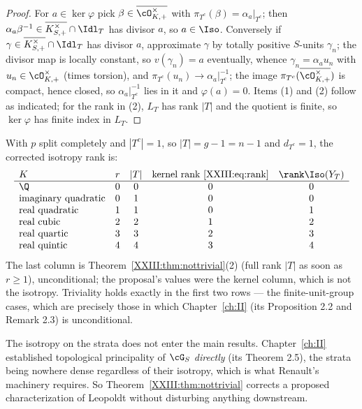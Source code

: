 \begin{proof}
For $a\in\ker\varphi$ pick $\beta\in\overline{\cO^\times_{K,+}}$ with
$\pi_{T^c}(\beta)=\alpha_a|_{T^c}$; then $\alpha_a\beta^{-1}\in
\overline{K^\times_{S,+}}\cap\Idl_T$ has divisor $a$, so $a\in\Iso$. Conversely if
$\gamma\in\overline{K^\times_{S,+}}\cap\Idl_T$ has divisor $a$, approximate $\gamma$ by
totally positive $S$-units $\gamma_n$; the divisor map is locally constant, so
$v(\gamma_n)=a$ eventually, whence $\gamma_n=\alpha_au_n$ with
$u_n\in\cO^\times_{K,+}$ (times torsion), and $\pi_{T^c}(u_n)\to\alpha_a|_{T^c}^{-1}$; the
image $\pi_{T^c}(\overline{\cO^\times_{K,+}})$ is compact, hence closed, so
$\alpha_a|_{T^c}^{-1}$ lies in it and $\varphi(a)=0$. Items (1) and (2) follow as indicated;
for the rank in (2), $L_T$ has rank $|T|$ and the quotient is finite, so
$\ker\varphi$ has finite index in $L_T$.
\end{proof}

\begin{remark}\label{XXIII:rem:table}
With $p$ split completely and $|T^c|=1$, so $|T|=g-1=n-1$ and $d_{T^c}=1$, the corrected
isotropy rank is:
\[
\begin{array}{lcccc}
K & r & |T| & \text{kernel rank \eqref{XXIII:eq:rank}} & \rank\Iso(Y_T)\\\hline
\Q & 0 & 0 & 0 & 0\\
\text{imaginary quadratic} & 0 & 1 & 0 & 0\\
\text{real quadratic} & 1 & 1 & 0 & 1\\
\text{real cubic} & 2 & 2 & 1 & 2\\
\text{real quartic} & 3 & 3 & 2 & 3\\
\text{real quintic} & 4 & 4 & 3 & 4
\end{array}
\]
The last column is Theorem~\ref{XXIII:thm:nottrivial}(2) (full rank $|T|$ as soon as $r\ge1$),
unconditional; the proposal's values were the kernel column, which is not the isotropy.
Triviality holds exactly in the first two rows --- the finite-unit-group cases, which are
precisely those in which Chapter~\ref{ch:II} (its Proposition 2.2 and Remark 2.3) is unconditional.
\end{remark}

\begin{remark}\label{XXIII:rem:nodependence}
The isotropy on the strata does not enter the main results. Chapter~\ref{ch:II}
established topological principality of $\cG_S$ \emph{directly} (its Theorem 2.5), the
strata being nowhere
dense regardless of their isotropy, which is what Renault's machinery requires. So
Theorem~\ref{XXIII:thm:nottrivial} corrects a proposed characterization of Leopoldt without
disturbing anything downstream.
\end{remark}

